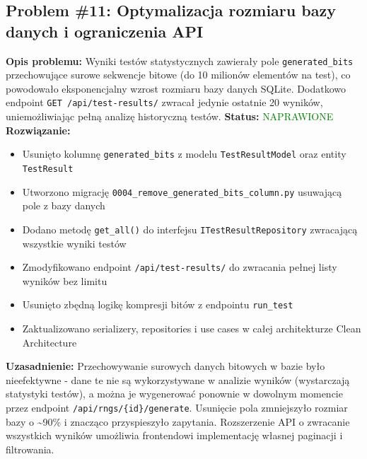 \documentclass[12pt,a4paper]{article}
\begin{document}
 \subsection{Problem \#11: Optymalizacja rozmiaru bazy danych i ograniczenia API}                   
  \begin{tcolorbox}[colback=violet!5!white,colframe=violet!75!black,title=Problem Projektowy - Priorytet: WYSOKI]  
  \textbf{Opis problemu:}                                                                           
  Wyniki testów statystycznych zawierały pole \texttt{generated\_bits} przechowujące surowe sekwencje bitowe (do 10
   milionów elementów na test), co powodowało eksponencjalny wzrost rozmiaru bazy danych SQLite. Dodatkowo endpoint
   \texttt{GET /api/test-results/} zwracał jedynie ostatnie 20 wyników, uniemożliwiając pełną analizę historyczną  
  testów.    
  \newline
  \textbf{Status:} \textcolor{green}{NAPRAWIONE}  
  \textbf{Rozwiązanie:}                                                                             
  \begin{itemize}                                                                                   
      \item Usunięto kolumnę \texttt{generated\_bits} z modelu \texttt{TestResultModel} oraz entity 
  \texttt{TestResult}                                                                               
      \item Utworzono migrację \texttt{0004\_remove\_generated\_bits\_column.py} usuwającą pole z bazy danych      
      \item Dodano metodę \texttt{get\_all()} do interfejsu \texttt{ITestResultRepository} zwracającą wszystkie    
  wyniki testów                                                                                     
      \item Zmodyfikowano endpoint \texttt{/api/test-results/} do zwracania pełnej listy wyników bez limitu        
      \item Usunięto zbędną logikę kompresji bitów z endpointu \texttt{run\_test}                   
      \item Zaktualizowano serializery, repositories i use cases w całej architekturze Clean Architecture          
  \end{itemize}                                                                                        
  \textbf{Uzasadnienie:}            
  Przechowywanie surowych danych bitowych w bazie było nieefektywne - dane te nie są wykorzystywane w analizie     
  wyników (wystarczają statystyki testów), a można je wygenerować ponownie w dowolnym momencie przez endpoint      
  \texttt{/api/rngs/\{id\}/generate}. Usunięcie pola zmniejszyło rozmiar bazy o \textasciitilde90\% i znacząco     
  przyspieszyło zapytania. Rozszerzenie API o zwracanie wszystkich wyników umożliwia frontendowi implementację     
  własnej paginacji i filtrowania.                                               
  \end{tcolorbox} 
\end{document}
